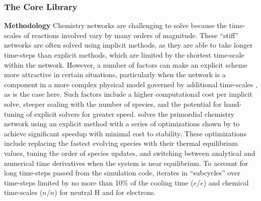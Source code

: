 \subsubsection{The Core Library}
\label{sec:core-library}

\noindent
{\bf Methodology}
Chemistry networks are challenging to solve because the time-scales of
reactions involved vary by many orders of magnitude.  These ``stiff''
networks are often solved using implicit methods, as they are able to
take longer time-steps than explicit methods, which are limited by the
shortest time-scale within the network.  However, a number of factors
can make an explicit scheme more attractive in certain situations,
particularly when the network is a component in a more complex physical
model governed by additional time-scales \citep{2012JCoPh.231.5266G},
as is the case here.  Such factors include a higher
computational cost per implicit solve, steeper scaling
with the number of species, and the potential for hand-tuning of
explicit solvers for greater speed.  \grackle{} solves the primordial
chemistry network using an explicit method with a series of
optimizations shown by \citet{1997NewA....2..181A} to achieve
significant speedup with minimal cost to stability.  These
optimizations include replacing the fastest evolving species with
their thermal equilibrium values, tuning the order of species updates,
and switching between analytical and numerical time derivatives when
the system is near equilibrium. To account for long time-steps passed
from the simulation code, \grackle{} iterates in ``subcycles'' over
time-steps limited by no more than 10\% of the cooling time
($e/\dot{e}$) and chemical time-scales ($n/\dot{n}$) for neutral H and
for electrons.

